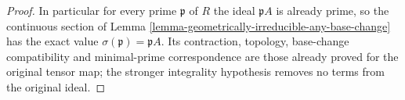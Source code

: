 \begin{proof}
In particular for every prime
$\mathfrak p$ of $R$ the ideal
$\mathfrak pA$ is already prime,
so the continuous section of
Lemma
\ref{lemma-geometrically-irreducible-any-base-change}
has the exact value
$\sigma(\mathfrak p)=\mathfrak pA$.
Its contraction, topology,
base-change compatibility and
minimal-prime correspondence
are those already proved for
the original tensor map;
the stronger integrality
hypothesis removes no terms
from the original ideal.
\end{proof}